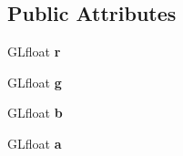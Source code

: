 \subsection*{Public Attributes}
\begin{DoxyCompactItemize}
\item 
\mbox{\label{structColor4F_a7591692fc8648b677b5b2138f4919495}} 
G\+Lfloat {\bfseries r}
\item 
\mbox{\label{structColor4F_a425415643d5f0161e386db84fcd5c668}} 
G\+Lfloat {\bfseries g}
\item 
\mbox{\label{structColor4F_a0fe86e779f9a2073da1292dd3637e47b}} 
G\+Lfloat {\bfseries b}
\item 
\mbox{\label{structColor4F_ae58e4ae2c9bca0fecca48f46deabb90e}} 
G\+Lfloat {\bfseries a}
\end{DoxyCompactItemize}
